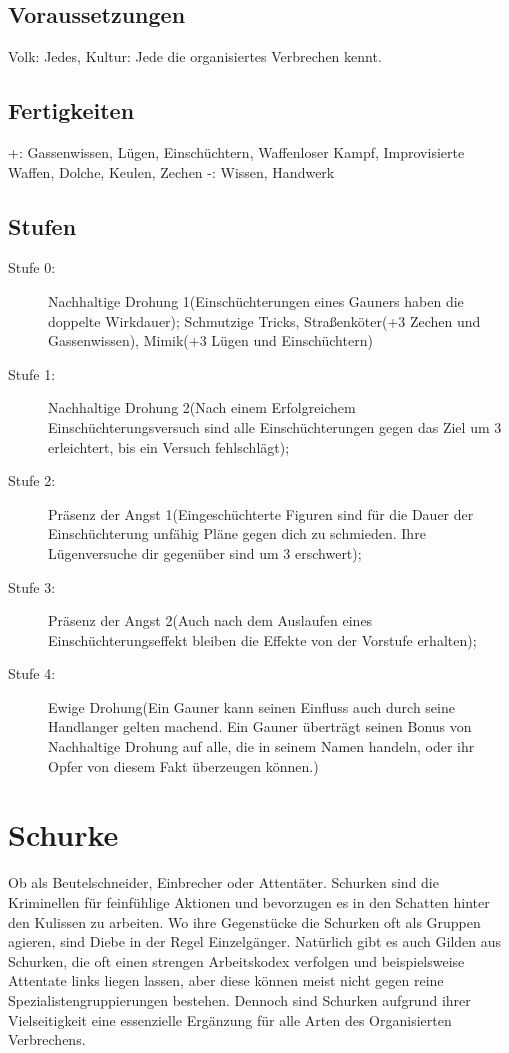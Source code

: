 \documentclass[a4paper,12pt,oneside]{book}
\begin{document}
\subsection{Voraussetzungen}
Volk: Jedes, Kultur: Jede die organisiertes Verbrechen kennt.
\subsection{Fertigkeiten}
+: Gassenwissen, Lügen, Einschüchtern, Waffenloser Kampf, Improvisierte Waffen, Dolche, Keulen, Zechen
-: Wissen, Handwerk
\subsection{Stufen}
\begin{description}
\item[Stufe 0:] Nachhaltige Drohung 1(Einschüchterungen eines Gauners haben die doppelte Wirkdauer); Schmutzige Tricks, Straßenköter(+3 Zechen und Gassenwissen), Mimik(+3 Lügen und Einschüchtern) 
\item[Stufe 1:] Nachhaltige Drohung 2(Nach einem Erfolgreichem Einschüchterungsversuch sind alle Einschüchterungen gegen das Ziel um 3 erleichtert, bis ein Versuch fehlschlägt);
\item[Stufe 2:] Präsenz der Angst 1(Eingeschüchterte Figuren sind für die Dauer der Einschüchterung unfähig Pläne gegen dich zu schmieden. Ihre Lügenversuche dir gegenüber sind um 3 erschwert);
\item[Stufe 3:] Präsenz der Angst 2(Auch nach dem Auslaufen eines Einschüchterungseffekt bleiben die Effekte von der Vorstufe erhalten);
\item[Stufe 4:] Ewige Drohung(Ein Gauner kann seinen Einfluss auch durch seine Handlanger gelten machend. Ein Gauner überträgt seinen Bonus von Nachhaltige Drohung auf alle, die in seinem Namen handeln, oder ihr Opfer von diesem Fakt überzeugen können.)
\end{description}
\section{Schurke}
Ob als Beutelschneider, Einbrecher oder Attentäter. Schurken sind die Kriminellen für feinfühlige Aktionen und bevorzugen es in den Schatten hinter den Kulissen zu arbeiten. Wo ihre Gegenstücke die Schurken oft als Gruppen agieren, sind Diebe in der Regel Einzelgänger. Natürlich gibt es auch Gilden aus Schurken, die oft einen strengen Arbeitskodex verfolgen und beispielsweise Attentate links liegen lassen, aber diese können meist nicht gegen reine Spezialistengruppierungen bestehen. Dennoch sind Schurken aufgrund ihrer Vielseitigkeit eine essenzielle Ergänzung für alle Arten des Organisierten Verbrechens.
\end{document}
